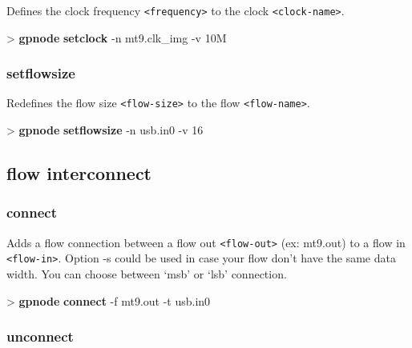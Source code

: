 \documentclass[10pt,a4paper]{article}
\begin{document}
Defines the clock frequency \texttt{<frequency>} to the clock \texttt{<clock-name>}.

\begin{sampletitle}
> \textbf{gpnode} \textbf{setclock} -n mt9.clk\_img -v 10M
\end{sampletitle}

\subsubsection{setflowsize}

Redefines the flow size \texttt{<flow-size>} to the flow \texttt{<flow-name>}.

\begin{sampletitle}
> \textbf{gpnode} \textbf{setflowsize} -n usb.in0 -v 16
\end{sampletitle}

\subsection{flow interconnect}
\subsubsection{connect}

Adds a flow connection between a flow out \texttt{<flow-out>} (ex: mt9.out) to a flow in \texttt{<flow-in>}. Option -s could be used in case your flow don't have the same data width. You can choose between `msb' or `lsb' connection.

\begin{sampletitle}
> \textbf{gpnode} \textbf{connect} -f mt9.out -t usb.in0
\end{sampletitle}


\subsubsection{unconnect}
\end{document}
